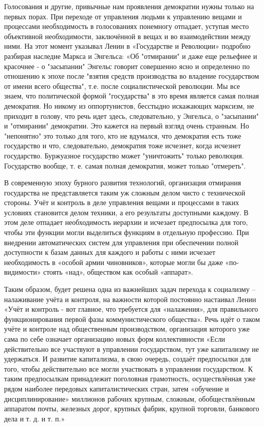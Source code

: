 \documentclass[12pt,a4paper,openany]{book}
\begin{document}
Голосования и другие, привычные нам проявления демократии нужны только на первых порах. При переходе от управления людьми к управлению вещами и процессами необходимость в голосованиях понемногу отпадает, уступая место объективной необходимости, заключённой в вещах и во взаимодействии между ними. На этот момент указывал Ленин в «Государстве и Революции» подробно разбирая наследие Маркса и Энгельса: «Об "отмирании" и даже еще рельефнее и красочнее - о "засыпании" Энгельс говорит совершенно ясно и определенно по отношению к эпохе после "взятия средств производства во владение государством от имени всего общества", т.е. после социалистической революции. Мы все знаем, что политической формой "государства" в это время является самая полная демократия. Но никому из оппортунистов, бесстыдно искажающих марксизм, не приходит в голову, что речь идет здесь, следовательно, у Энгельса, о "засыпании" и "отмирании" демократии. Это кажется на первый взгляд очень странным. Но "непонятно" это только для того, кто не вдумался, что демократия есть тоже государство и что, следовательно, демократия тоже исчезнет, когда исчезнет государство. Буржуазное государство может "уничтожить" только революция. Государство вообще, т. е. самая полная демократия, может только "отмереть".

В современную эпоху бурного развития технологий, организация отмирания государства не представляется таким уж сложным делом чисто с технической стороны. Учёт и контроль в деле управления вещами и процессами в таких условиях становится делом техники, а его результаты доступными каждому. В этом деле отпадает необходимость иерархии и исчезает предпосылка для того, чтобы эти функции могли выделиться функциям в отдельную профессию. При внедрении автоматических систем для управления при обеспечении полной доступности к базам данных для каждого и работы с ними исчезает необходимость в «особой армии чиновников», которые могли бы даже «по-видимости» стоять «над», обществом как особый «аппарат».

Таким образом, будет решена одна из важнейших задач перехода к социализму – налаживание учёта и контроля, на важности которой постоянно настаивал Ленин «Учёт и контроль - вот главное, что требуется для «налажения», для правильного функционирования первой фазы коммунистического общества». Речь идёт о таком учёте и контроле над общественным производством, организация которого уже сама по себе означает организацию новых форм коллективности «Если действительно все участвуют в управлении государством, тут уже капитализму не удержаться. И развитие капитализма, в свою очередь, создаёт предпосылки для того, чтобы действительно все могли участвовать в управлении государством. К таким предпосылкам принадлежит поголовная грамотность, осуществлённая уже рядом наиболее передовых капиталистических стран, затем «обучение и дисциплинирование» миллионов рабочих крупным, сложным, обобществлённым аппаратом почты, железных дорог, крупных фабрик, крупной торговли, банкового дела и т. д. и т. п.»
\end{document}
